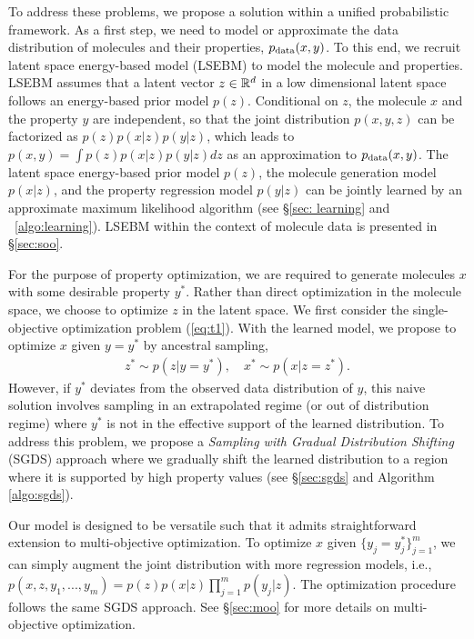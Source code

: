 \documentclass[accepted]{uai2023} %
\newcommand{\mysecref}[1]{\S\ref{#1}}
\newcommand{\todo}[1]{\textcolor{blue}{#1}}
\begin{document}
To address these problems, we propose a solution within a unified probabilistic framework. As a first step, we need to model or approximate the data distribution of molecules and their properties, $p_{\rm data}(x, y)$. 
To this end, we recruit latent space energy-based model (LSEBM) \citep{pang2020learning,nie2021controllable} to model the molecule and properties. LSEBM assumes that a latent vector $z \in {\mathbb{R}}^d$ in a low dimensional latent space follows an energy-based prior model $p(z)$. Conditional on $z$, the molecule $x$ and the property $y$ are independent, so that the joint distribution $p(x, y, z)$ can be factorized as $p(z)p(x|z)p(y|z)$, which leads to $p(x, y) = \int p(z) p(x|z) p(y|z) dz$ as an approximation to $p_{\rm data}(x, y)$. 
The latent space energy-based prior model $p(z)$, the molecule generation model $p(x|z)$, and the property regression model $p(y|z)$ can be jointly learned by an  approximate maximum likelihood algorithm (see \mysecref{sec: learning} and ~\cref{algo:learning}). LSEBM within the context of molecule data is presented in \mysecref{sec:soo}. 

For the purpose of property optimization, we are required to generate molecules $x$ with some desirable property $y^*$. Rather than direct optimization in the molecule space, we choose to optimize $z$ in the latent space. We first consider the single-objective optimization problem (\cref{eq:t1}). 
 With the learned model, we propose to optimize $x$ given $y=y^*$ by ancestral sampling,
\begin{align}
    z^* \sim p(z | y = y^*),\quad x^* \sim p(x | z=z^*).
\end{align}
 However, if $y^*$ deviates from the observed data distribution of $y$, this naive solution involves sampling in an extrapolated regime (or out of distribution regime) where $y^*$ is not in the effective support of the learned distribution. To address this problem, we propose a \textit{Sampling with Gradual Distribution Shifting} (SGDS) approach where we gradually shift the learned distribution to a region where it is supported by high property values (see \mysecref{sec:sgds} and Algorithm \ref{algo:sgds}). 

Our model is designed to be versatile such that it admits straightforward extension to multi-objective optimization. To optimize $x$ given $\{y_j = y_j^*\}_{j=1}^m$, we can simply augment the joint distribution with more regression models, i.e., $p(x, z, y_1, ..., y_m) = p(z) p(x|z) \prod_{j=1}^m p(y_j|z)$. The optimization procedure follows the same SGDS approach. See \mysecref{sec:moo} for more details on multi-objective optimization.
\end{document}
